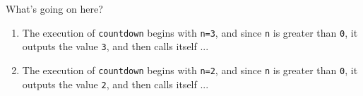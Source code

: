 \documentclass[t,handout,9pt]{beamer}
\begin{document}
\begin{frame}
\vfill
What's going on here?
\begin{enumerate}
	\item The execution of \texttt{countdown} begins with \texttt{n=3}, and since \texttt{n} is greater than \texttt{0}, it outputs the value \texttt{3}, and then calls itself ...
	\setlength{\itemindent}{0.1in}
	\item The execution of \texttt{countdown} begins with \texttt{n=2}, and since \texttt{n} is greater than \texttt{0}, it outputs the value \texttt{2}, and then calls itself ...

\end{enumerate}
\end{frame}
\end{document}
